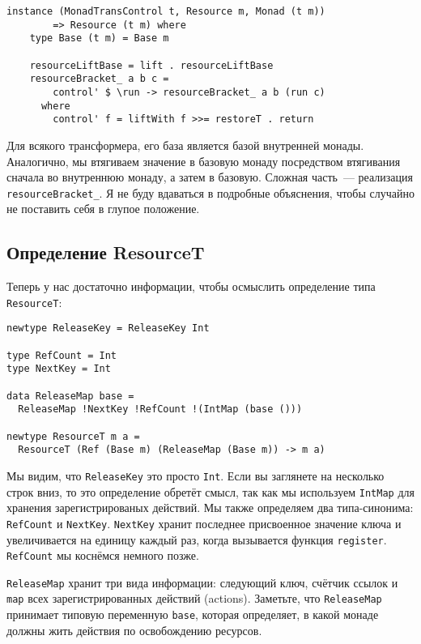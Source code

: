 \begin{lstlisting}
instance (MonadTransControl t, Resource m, Monad (t m))
        => Resource (t m) where
    type Base (t m) = Base m

    resourceLiftBase = lift . resourceLiftBase
    resourceBracket_ a b c =
        control' $ \run -> resourceBracket_ a b (run c)
      where
        control' f = liftWith f >>= restoreT . return 
\end{lstlisting}

Для всякого трансформера, его база является базой внутренней монады. Аналогично, мы втягиваем значение в базовую монаду посредством втягивания сначала во внутреннюю монаду, а затем в базовую.
Сложная часть~--- реализация \verb=resourceBracket_=. Я не буду вдаваться в подробные
объяснения, чтобы случайно не поставить себя в глупое положение.

\subsection{Определение ResourceT}

Теперь у нас достаточно информации, чтобы осмыслить определение типа
\lstinline'ResourceT':
\begin{lstlisting}
newtype ReleaseKey = ReleaseKey Int

type RefCount = Int
type NextKey = Int

data ReleaseMap base =
  ReleaseMap !NextKey !RefCount !(IntMap (base ()))

newtype ResourceT m a =
  ResourceT (Ref (Base m) (ReleaseMap (Base m)) -> m a)
\end{lstlisting}

Мы видим, что \lstinline'ReleaseKey' это просто \lstinline'Int'. Если вы заглянете на
несколько строк вниз, то
это определение обретёт смысл, так как мы используем \lstinline'IntMap' для хранения
зарегистрированых действий. Мы также определяем два типа-синонима: \lstinline'RefCount' и
\lstinline'NextKey'. \lstinline'NextKey'
хранит последнее присвоенное значение ключа и увеличивается на единицу каждый раз, когда
вызывается функция \verb=register=. \lstinline{RefCount} мы коснёмся немного позже.

\lstinline'ReleaseMap' хранит три вида информации: следующий ключ, счётчик ссылок и
\lstinline'map' всех
зарегистрированных действий (actions). Заметьте, что \lstinline'ReleaseMap' принимает
типовую переменную \lstinline'base', которая определяет, в какой монаде должны жить действия по освобождению ресурсов.

